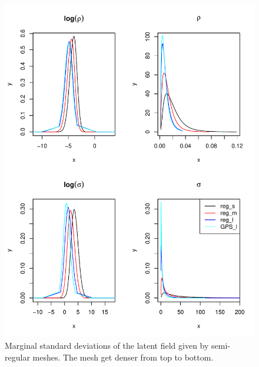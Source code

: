 \documentclass[a4paper,12pt]{article}
\begin{document}
\begin{figure}[htbp]
 \begin{center}
 \includegraphics[scale=0.8]{fig/Meshcompare_hyperpar.pdf}
 \end{center}
 \caption[Semi-regular mesh]{Marginal standard deviations of the latent field given by semi-regular meshes. The mesh get denser from top to bottom.}
 \label{fig:mesh_comp_hyper}
 \end{figure}
\end{document}
